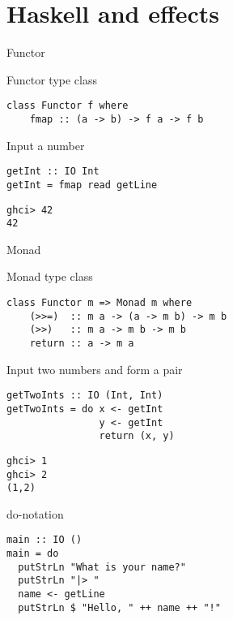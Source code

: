 \section{Haskell and effects}

\begin{frame}[fragile]{Functor}
  \begin{block}{Functor type class}
  \begin{verbatim}
class Functor f where
    fmap :: (a -> b) -> f a -> f b
  \end{verbatim}
  \end{block}
  \pause
  \begin{block}{Input a number}
  \begin{verbatim}
getInt :: IO Int
getInt = fmap read getLine
  \end{verbatim}
  \end{block}
  \pause
  \begin{block}{}
  \begin{verbatim}
ghci> 42
42
  \end{verbatim}
  \end{block}
\end{frame}

\begin{frame}[fragile]{Monad}
  \begin{block}{Monad type class}
  \begin{verbatim}
class Functor m => Monad m where
    (>>=)  :: m a -> (a -> m b) -> m b
    (>>)   :: m a -> m b -> m b
    return :: a -> m a
  \end{verbatim}
  \end{block}
  \pause
  \begin{block}{Input two numbers and form a pair}
  \begin{verbatim}
getTwoInts :: IO (Int, Int)
getTwoInts = do x <- getInt
                y <- getInt
                return (x, y)
  \end{verbatim}
  \end{block}
  \pause
  \begin{block}{}
  \begin{verbatim}
ghci> 1
ghci> 2
(1,2)
  \end{verbatim}
  \end{block}
\end{frame}

\begin{frame}[fragile]{do-notation}
  \begin{block}{}
  \begin{verbatim}
main :: IO ()
main = do
  putStrLn "What is your name?"
  putStrLn "|> "
  name <- getLine
  putStrLn $ "Hello, " ++ name ++ "!"
  \end{verbatim}
  \end{block}
\end{frame}

